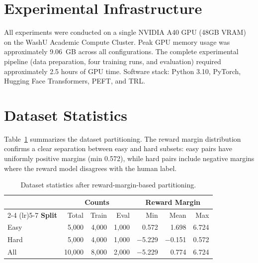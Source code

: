 \documentclass{article}
\begin{document}
\section{Experimental Infrastructure}

All experiments were conducted on a single NVIDIA A40 GPU (48GB VRAM) on the WashU Academic Compute Cluster. Peak GPU memory usage was approximately 9.06~GB across all configurations. The complete experimental pipeline (data preparation, four training runs, and evaluation) required approximately 2.5 hours of GPU time. Software stack: Python 3.10, PyTorch, Hugging Face Transformers, PEFT, and TRL.

\section{Dataset Statistics}

Table~\ref{tab:dataset} summarizes the dataset partitioning. The reward margin distribution confirms a clear separation between easy and hard subsets: easy pairs have uniformly positive margins (min 0.572), while hard pairs include negative margins where the reward model disagrees with the human label.

\begin{table}[ht]
\caption{Dataset statistics after reward-margin-based partitioning.}
\label{tab:dataset}
\centering
\small
\begin{tabular}{l rrr rrr}
\toprule
& \multicolumn{3}{c}{\textbf{Counts}} & \multicolumn{3}{c}{\textbf{Reward Margin}} \\
\cmidrule(lr){2-4} \cmidrule(lr){5-7}
\textbf{Split} & Total & Train & Eval & Min & Mean & Max \\
\midrule
Easy & 5,000 & 4,000 & 1,000 & 0.572 & 1.698 & 6.724 \\
Hard & 5,000 & 4,000 & 1,000 & $-$5.229 & $-$0.151 & 0.572 \\
All  & 10,000 & 8,000 & 2,000 & $-$5.229 & 0.774 & 6.724 \\
\bottomrule
\end{tabular}
\end{table}
\end{document}
